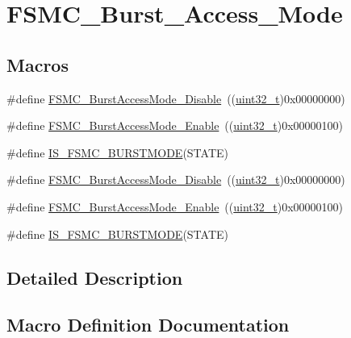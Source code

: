 \hypertarget{group___f_s_m_c___burst___access___mode}{}\section{F\+S\+M\+C\+\_\+\+Burst\+\_\+\+Access\+\_\+\+Mode}
\label{group___f_s_m_c___burst___access___mode}
\subsection*{Macros}
\begin{DoxyCompactItemize}
\item 
\#define \hyperlink{group___f_s_m_c___burst___access___mode_ga26fc544945415e350563a9b00684850c}{F\+S\+M\+C\+\_\+\+Burst\+Access\+Mode\+\_\+\+Disable}~((\hyperlink{_p_e___types_8h_a33594304e786b158f3fb30289278f5af}{uint32\+\_\+t})0x00000000)
\item 
\#define \hyperlink{group___f_s_m_c___burst___access___mode_ga841831dfacfdd8889dafe26cc594bf02}{F\+S\+M\+C\+\_\+\+Burst\+Access\+Mode\+\_\+\+Enable}~((\hyperlink{_p_e___types_8h_a33594304e786b158f3fb30289278f5af}{uint32\+\_\+t})0x00000100)
\item 
\#define \hyperlink{group___f_s_m_c___burst___access___mode_gaf8736659c5064c3c03753d7874401e71}{I\+S\+\_\+\+F\+S\+M\+C\+\_\+\+B\+U\+R\+S\+T\+M\+O\+DE}(S\+T\+A\+TE)
\item 
\#define \hyperlink{group___f_s_m_c___burst___access___mode_ga26fc544945415e350563a9b00684850c}{F\+S\+M\+C\+\_\+\+Burst\+Access\+Mode\+\_\+\+Disable}~((\hyperlink{_p_e___types_8h_a33594304e786b158f3fb30289278f5af}{uint32\+\_\+t})0x00000000)
\item 
\#define \hyperlink{group___f_s_m_c___burst___access___mode_ga841831dfacfdd8889dafe26cc594bf02}{F\+S\+M\+C\+\_\+\+Burst\+Access\+Mode\+\_\+\+Enable}~((\hyperlink{_p_e___types_8h_a33594304e786b158f3fb30289278f5af}{uint32\+\_\+t})0x00000100)
\item 
\#define \hyperlink{group___f_s_m_c___burst___access___mode_gaf8736659c5064c3c03753d7874401e71}{I\+S\+\_\+\+F\+S\+M\+C\+\_\+\+B\+U\+R\+S\+T\+M\+O\+DE}(S\+T\+A\+TE)
\end{DoxyCompactItemize}


\subsection{Detailed Description}


\subsection{Macro Definition Documentation}
